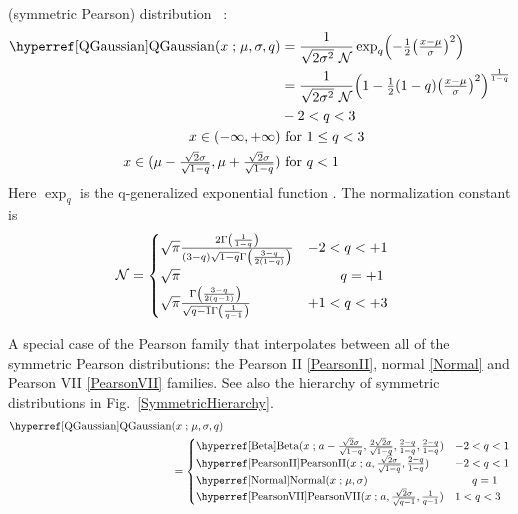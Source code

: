  (symmetric Pearson) distribution~\cite{Leeuwen1995} :
\begin{align}
\label{QGaussian}
\opr{QGaussian}(x\given \mu,\sigma,q) &= \frac{1}{\sqrt{2\sigma^2}  \ \mathcal{N}} \exp_q\Left(-\half \Left(\tfrac{x-\mu}{\sigma}\Right)^2 \Right) \checked
\\
 \notag
& = \frac{1}{\sqrt{2\sigma^2} \ \mathcal{N}}  \Left(1- \half (1-q) \Left(\tfrac{x-\mu}{\sigma}\Right)^2 \Right)^{\frac{1}{1-q} } \checked
\\
& -2 < q < 3
\notag
\\
x \in (-\infty, +\infty) &\text{ for } 1\leq q < 3
\notag
\\
x \in (\mu-{\tfrac{\sqrt{2}\sigma}{\sqrt{1-q}}}, \mu+{\tfrac{\sqrt{2}\sigma}{\sqrt{1-q}}}) & \text{ for } q < 1
\notag
\end{align}
Here $ \exp_q$ is the q-generalized exponential function . The normalization constant is
\begin{align*}
\mathcal{N} &=
 \begin{cases} 
 \sqrt{\pi} \frac{   {2  \Gamma\Left({\frac{1}{1-q}}\Right)} }{ {(3-q) \sqrt{1-q} \Gamma\Left(\frac{3-q }{ 2(1-q)} \Right)}  } 
 & -2 <q < +1 \checked
\\
  \sqrt{\pi} & \phantom{-2<}q=+1  \checked
\\
 \sqrt{\pi}  \frac{{\Gamma\Left({\frac{3-q}{2(q-1)}}\Right)} }{ {\sqrt{q-1} \Gamma\Left(\frac{1 }{ q-1}\Right)}}&  +1<q<+3 \checked
\end{cases}
 \end{align*}

A special case of the Pearson family that interpolates between all of the symmetric Pearson distributions: the Pearson II \eqref{PearsonII}, normal \eqref{Normal} and Pearson VII \eqref{PearsonVII} families. See also the hierarchy of symmetric distributions in Fig.~\ref{SymmetricHierarchy}.
\begin{align*}
\opr{QGaussian}&(x\given \mu,\sigma,q) \\ &=
 \begin{cases}
\opr{Beta}(x\given a-\tfrac{\sqrt{2}\sigma}{\sqrt{1-q}},\tfrac{2\sqrt{2}\sigma}{\sqrt{1-q}},\tfrac{2-q}{1-q},\tfrac{2-q}{1-q}) 
 & -2 <q < 1 \checked
 \\
\opr{PearsonII}(x\given a,\tfrac{\sqrt{2}\sigma}{\sqrt{1-q}}, \tfrac{2-q}{1-q}) 
 & -2 <q < 1 \checked
\\
\opr{Normal}(x\given \mu,\sigma)   & \phantom{1<}q=1  \checked
\\
 \opr{PearsonVII}(x\given a,\tfrac{\sqrt{2}\sigma}{\sqrt{q-1}}, \tfrac{1}{q-1}) &  1<q<3 \checked
\end{cases}
 \end{align*}



